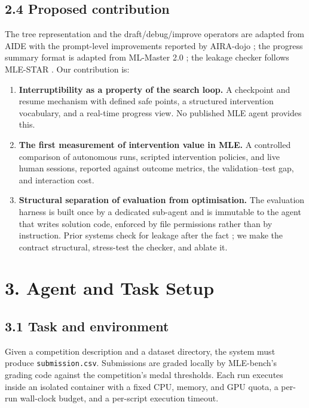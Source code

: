 \documentclass[11pt]{article}
\begin{document}
\subsection*{2.4 Proposed contribution}

The tree representation and the draft/debug/improve operators are adapted from AIDE
\cite{aide} with the prompt-level improvements reported by AIRA-dojo \cite{aira}; the
progress summary format is adapted from ML-Master 2.0 \cite{mlmaster2}; the leakage
checker follows MLE-STAR \cite{mlestar}. Our contribution is:

\begin{enumerate}[leftmargin=*,itemsep=0.2em]
    \item \textbf{Interruptibility as a property of the search loop.} A checkpoint
          and resume mechanism with defined safe points, a structured intervention
          vocabulary, and a real-time progress view. No published MLE agent provides
          this.
    \item \textbf{The first measurement of intervention value in MLE.} A controlled
          comparison of autonomous runs, scripted intervention policies, and live
          human sessions, reported against outcome metrics, the validation--test gap,
          and interaction cost.
    \item \textbf{Structural separation of evaluation from optimisation.} The
          evaluation harness is built once by a dedicated sub-agent and is immutable
          to the agent that writes solution code, enforced by file permissions
          rather than by instruction. Prior systems check for leakage after the fact
          \cite{mlestar}; we make the contract structural, stress-test the checker,
          and ablate it.
\end{enumerate}

\section*{3. Agent and Task Setup}

\subsection*{3.1 Task and environment}

Given a competition description and a dataset directory, the system must produce
\texttt{submission.csv}. Submissions are graded locally by MLE-bench's grading code
against the competition's medal thresholds. Each run executes inside an isolated
container with a fixed CPU, memory, and GPU quota, a per-run wall-clock budget, and a
per-script execution timeout.
\end{document}
